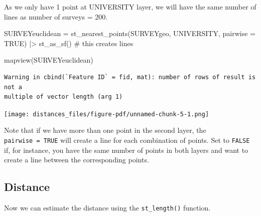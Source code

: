 \documentclass[
  letterpaper,
  DIV=11,
  numbers=noendperiod]{scrreprt}
\newenvironment{Shaded}{\begin{snugshade}}{\end{snugshade}}
\newcommand{\AttributeTok}[1]{\textcolor[rgb]{0.40,0.45,0.13}{#1}}
\newcommand{\CommentTok}[1]{\textcolor[rgb]{0.37,0.37,0.37}{#1}}
\newcommand{\ConstantTok}[1]{\textcolor[rgb]{0.56,0.35,0.01}{#1}}
\newcommand{\FunctionTok}[1]{\textcolor[rgb]{0.28,0.35,0.67}{#1}}
\newcommand{\NormalTok}[1]{\textcolor[rgb]{0.00,0.23,0.31}{#1}}
\newcommand{\OtherTok}[1]{\textcolor[rgb]{0.00,0.23,0.31}{#1}}
\newcommand{\SpecialCharTok}[1]{\textcolor[rgb]{0.37,0.37,0.37}{#1}}
\begin{document}
As we only have 1 point at UNIVERSITY layer, we will have the same
number of lines as number of surveys = 200.

\begin{Shaded}
\begin{Highlighting}[]
\NormalTok{SURVEYeuclidean }\OtherTok{=} \FunctionTok{st\_nearest\_points}\NormalTok{(SURVEYgeo, UNIVERSITY, }\AttributeTok{pairwise =} \ConstantTok{TRUE}\NormalTok{) }\SpecialCharTok{|\textgreater{}}
  \FunctionTok{st\_as\_sf}\NormalTok{() }\CommentTok{\# this creates lines}

\FunctionTok{mapview}\NormalTok{(SURVEYeuclidean)}
\end{Highlighting}
\end{Shaded}

\begin{verbatim}
Warning in cbind(`Feature ID` = fid, mat): number of rows of result is not a
multiple of vector length (arg 1)
\end{verbatim}

\texttt{[image: distances\_files/figure-pdf/unnamed-chunk-5-1.png]}

Note that if we have more than one point in the second layer, the
\texttt{pairwise\ =\ TRUE} will create a line for each combination of
points. Set to \texttt{FALSE} if, for instance, you have the same number
of points in both layers and want to create a line between the
corresponding points.

\subsection{Distance}\label{distance}

Now we can estimate the distance using the \texttt{st\_length()}
function.

\begin{Shaded}
\end{Shaded}
\end{document}

